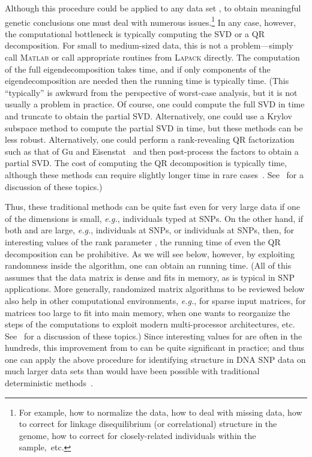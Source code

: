 \documentclass[twoside]{article}
\begin{document}
Although this procedure could be applied to any data set , to obtain 
meaningful genetic conclusions one must deal with numerous issues.\footnote{For example, how to normalize the data, how to deal with missing 
data, how to correct for linkage disequilibrium (or correlational) structure 
in the genome, how to correct for closely-related individuals within the 
sample,~etc.}
In any case, however, the computational bottleneck is typically computing 
the SVD or a QR decomposition.
For small to medium-sized data, this is not a problem---simply call
\textsc{Matlab} or call appropriate routines from \textsc{Lapack} directly.
The computation of the full eigendecomposition takes 
 time, and if only  components of the 
eigendecomposition are needed then the running time is typically  time.
(This ``typically'' is awkward from the perspective of worst-case
analysis, but it is not usually a problem in practice.  Of course, one could
compute the full SVD in  time and truncate to obtain 
the partial SVD.  Alternatively, one could use a Krylov subspace method to 
compute the partial SVD in  time, but these methods can be less 
robust.  Alternatively, one could perform a rank-revealing QR factorization
such as that of Gu and Eisenstat~\cite{GE96} and then post-process the 
factors to obtain a partial SVD.  The cost of computing the QR decomposition 
is typically  time, although these methods can require slightly 
longer time in rare cases~\cite{GE96}.  See~\cite{HMT09_SIREV} for a discussion of 
these topics.)

Thus, these traditional methods can be quite fast even for very large data 
if one of the dimensions is small, \emph{e.g.},  individuals typed at 
 SNPs.
On the other hand, if both  and  are large, \emph{e.g.},  
individuals at  SNPs, or  individuals at  SNPs, then, for
interesting values of the rank parameter , the  running time of 
even the QR decomposition can be prohibitive.
As we will see below, however, by exploiting randomness inside the 
algorithm, one can obtain an  running time.
(All of this assumes that the data matrix is dense and fits in 
memory, as is typical in SNP applications.  More generally, randomized 
matrix algorithms to be reviewed below also help in other computational 
environments, \emph{e.g.}, for sparse input matrices, for matrices too large 
to fit into main memory, when one wants to reorganize the steps of the 
computations to exploit modern multi-processor architectures, etc.  
See~\cite{HMT09_SIREV} for a discussion of these topics.)
Since interesting values for  are often in the hundreds, this improvement
from  to  can be quite significant in practice;
and thus one can apply the above procedure for identifying structure in 
DNA SNP data on much larger data sets than would have been possible with 
traditional deterministic methods~\cite{Sayan11-unpub}.
\end{document}
